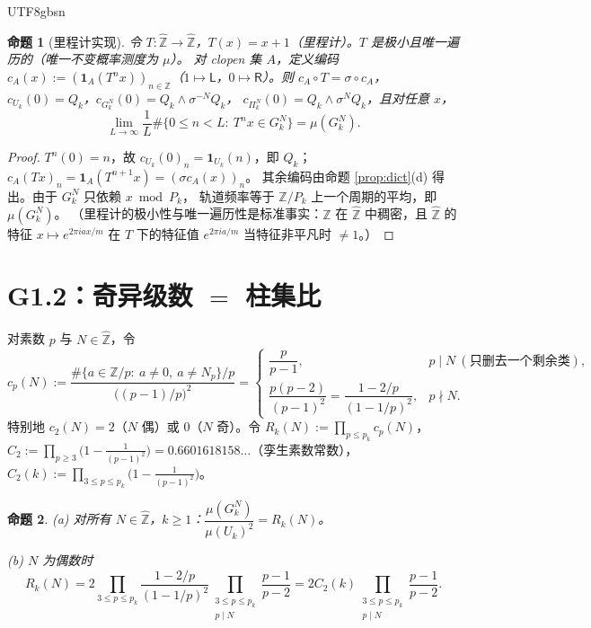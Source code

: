 \documentclass[11pt,a4paper]{article}
\newcommand{\Zhat}{\widehat{\mathbb Z}}
\newcommand{\Haar}{\mu}
\newcommand{\Lsym}{\ensuremath{\mathsf{L}}}
\newcommand{\Rsym}{\ensuremath{\mathsf{R}}}
\newcommand{\status}[1]{\par\noindent\fbox{\textbf{状态：#1}}\par\smallskip}
\theoremstyle{plain}
\newtheorem{prop}{命题}[section]
\theoremstyle{definition}
\begin{document}
\begin{CJK}{UTF8}{gbsn}
\begin{prop}[里程计实现]\label{prop:odometer}
令 $T:\Zhat\to\Zhat$，$T(x)=x+1$（里程计）。$T$ 是极小且唯一遍历的（唯一不变概率测度为 $\Haar$）。
对 clopen 集 $A$，定义编码 $c_A(x):=(\mathbf 1_A(T^nx))_{n\in\mathbb Z}$（$1\mapsto\Lsym$，$0\mapsto\Rsym$）。则
$c_A\circ T=\sigma\circ c_A$，$c_{U_k}(0)=Q_k$，$c_{G_k^N}(0)=Q_k\wedge\sigma^{-N}Q_k$，
$c_{\Pi_k^N}(0)=Q_k\wedge\sigma^{N}Q_k$，且对任意 $x$，
\[
\lim_{L\to\infty}\frac1L\#\{0\le n<L:\ T^nx\in G_k^N\}=\Haar(G_k^N).
\]
\end{prop}
\status{已证}
\begin{proof}
$T^n(0)=n$，故 $c_{U_k}(0)_n=\mathbf 1_{U_k}(n)$，即 $Q_k$；$c_A(Tx)_n=\mathbf 1_A(T^{n+1}x)=(\sigma c_A(x))_n$。
其余编码由命题 \ref{prop:dict}(d) 得出。由于 $G_k^N$ 只依赖 $x\bmod P_k$，
轨道频率等于 $\mathbb Z/P_k$ 上一个周期的平均，即 $\Haar(G_k^N)$。
（里程计的极小性与唯一遍历性是标准事实：$\mathbb Z$ 在 $\Zhat$ 中稠密，且 $\Zhat$ 的特征 $x\mapsto e^{2\pi i a x/m}$
在 $T$ 下的特征值 $e^{2\pi i a/m}$ 当特征非平凡时 $\ne1$。）
\end{proof}

\section{G1.2：奇异级数 $=$ 柱集比}\label{sec:ratio}

对素数 $p$ 与 $N\in\Zhat$，令
\[
c_p(N):=\frac{\#\{a\in\mathbb Z/p:\ a\ne0,\ a\ne N_p\}/p}{\bigl((p-1)/p\bigr)^2}
=\begin{cases}
\dfrac{p}{p-1}, & p\mid N\ (\text{只删去一个剩余类}),\\[8pt]
\dfrac{p(p-2)}{(p-1)^2}=\dfrac{1-2/p}{(1-1/p)^2}, & p\nmid N .
\end{cases}
\]
特别地 $c_2(N)=2$（$N$ 偶）或 $0$（$N$ 奇）。令 $R_k(N):=\prod_{p\le p_k}c_p(N)$，
$C_2:=\prod_{p\ge3}\bigl(1-\frac1{(p-1)^2}\bigr)=0.6601618158\ldots$（孪生素数常数），
$C_2(k):=\prod_{3\le p\le p_k}\bigl(1-\frac1{(p-1)^2}\bigr)$。

\begin{prop}\label{prop:ratio}
(a) 对所有 $N\in\Zhat$，$k\ge1$：$\dfrac{\Haar(G_k^N)}{\Haar(U_k)^2}=R_k(N)$。

(b) $N$ 为偶数时
\[
R_k(N)=2\prod_{3\le p\le p_k}\frac{1-2/p}{(1-1/p)^2}\prod_{\substack{3\le p\le p_k\\ p\mid N}}\frac{p-1}{p-2}
=2C_2(k)\prod_{\substack{3\le p\le p_k\\ p\mid N}}\frac{p-1}{p-2}.
\]


\end{prop}
\end{CJK}
\end{document}
